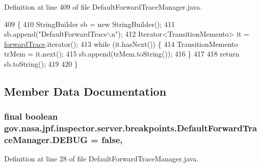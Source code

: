 Definition at line 409 of file Default\+Forward\+Trace\+Manager.\+java.


\begin{DoxyCode}
409                             \{
410     StringBuilder sb = \textcolor{keyword}{new} StringBuilder();
411     sb.append(\textcolor{stringliteral}{"DefaultForwardTrace\(\backslash\)n"});
412     Iterator<TransitionMemento> it = \hyperlink{classgov_1_1nasa_1_1jpf_1_1inspector_1_1server_1_1breakpoints_1_1_default_forward_trace_manager_ae2746ab2733a47bce8ee3fe677d6e396}{forwardTrace}.iterator();
413     \textcolor{keywordflow}{while} (it.hasNext()) \{
414       TransitionMemento trMem = it.next();
415       sb.append(trMem.toString());
416     \}
417 
418     \textcolor{keywordflow}{return} sb.toString();
419 
420   \}
\end{DoxyCode}


\subsection{Member Data Documentation}
\subsubsection[{\texorpdfstring{D\+E\+B\+UG}{DEBUG}}]{\setlength{\rightskip}{0pt plus 5cm}final boolean gov.\+nasa.\+jpf.\+inspector.\+server.\+breakpoints.\+Default\+Forward\+Trace\+Manager.\+D\+E\+B\+UG = false\hspace{0.3cm}{\ttfamily [static]}, {\ttfamily [private]}}\hypertarget{classgov_1_1nasa_1_1jpf_1_1inspector_1_1server_1_1breakpoints_1_1_default_forward_trace_manager_a7ab6cf030f9e6b331c4403bfb79e2fd0}{}\label{classgov_1_1nasa_1_1jpf_1_1inspector_1_1server_1_1breakpoints_1_1_default_forward_trace_manager_a7ab6cf030f9e6b331c4403bfb79e2fd0}


Definition at line 28 of file Default\+Forward\+Trace\+Manager.\+java.

